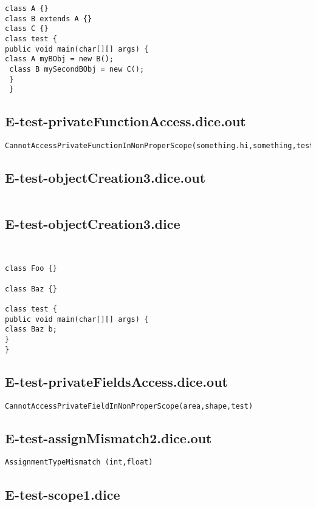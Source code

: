 \begin{verbatim}
class A {}
class B extends A {}
class C {}
class test {
public void main(char[][] args) {
class A myBObj = new B();
 class B mySecondBObj = new C();
 }
 }
\end{verbatim}\pagebreak\subsection{E-test-privateFunctionAccess.dice.out}
\begin{verbatim}
CannotAccessPrivateFunctionInNonProperScope(something.hi,something,test)

\end{verbatim}\pagebreak\subsection{E-test-objectCreation3.dice.out}
\begin{verbatim}

\end{verbatim}\pagebreak\subsection{E-test-objectCreation3.dice}
\begin{verbatim}


class Foo {}

class Baz {}

class test {
public void main(char[][] args) {
class Baz b;
}
}

\end{verbatim}\pagebreak\subsection{E-test-privateFieldsAccess.dice.out}
\begin{verbatim}
CannotAccessPrivateFieldInNonProperScope(area,shape,test)

\end{verbatim}\pagebreak\subsection{E-test-assignMismatch2.dice.out}
\begin{verbatim}
AssignmentTypeMismatch (int,float)

\end{verbatim}\pagebreak\subsection{E-test-scope1.dice}

